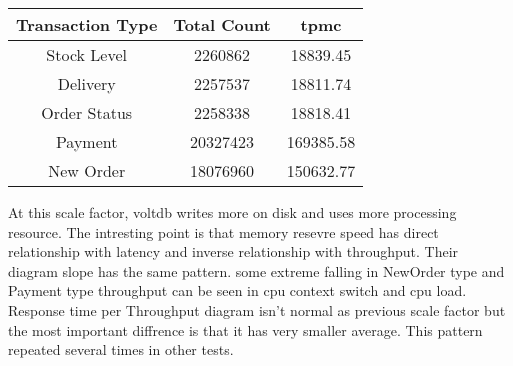 \documentclass[../../main.tex]{subfiles}
\begin{document}
\begin{minipage}{.5\textwidth}
    \end{minipage}
    \begin{minipage}{.5\textwidth}
        \begin{center}
            \begin{tabular}{ |c|c|c| } 
                \hline
                Transaction Type & Total Count & tpmc\\
                \hline
                Stock Level & 2260862 & 18839.45 \\
                Delivery & 2257537 & 18811.74 \\
                Order Status & 2258338 & 18818.41 \\
                Payment & 20327423 & 169385.58 \\
                New Order & 18076960 & 150632.77 \\
                \hline
            \end{tabular}
        \end{center}
    \end{minipage}
    At this scale factor, voltdb writes more on disk and uses more processing resource. The intresting point is that memory resevre speed has direct relationship with latency and inverse relationship with throughput. Their diagram slope has the same pattern.
    some extreme falling in NewOrder type and Payment type throughput can be seen in cpu context switch and cpu load.
    Response time per Throughput diagram isn't normal as previous scale factor but the most important diffrence is that it has very smaller average.
    This pattern repeated several times in other tests.
\end{document}
